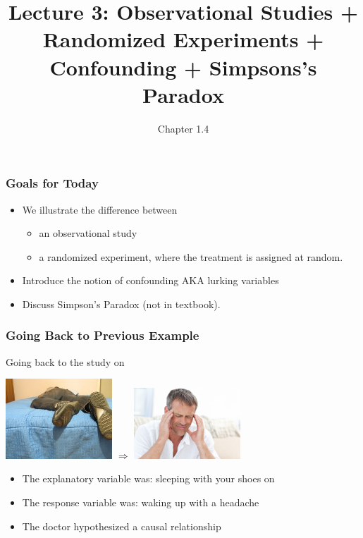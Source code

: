 \documentclass[handout]{beamer}
\title{Lecture 3: Observational Studies + Randomized Experiments + Confounding + Simpsons's Paradox}
\author{Chapter 1.4}
\date{}
\newcommand{\blue}[1]{\textcolor{blue2}{#1}}
\begin{document}
\begin{frame}
\titlepage
\end{frame}


\begin{frame}
\frametitle{Goals for Today}

\begin{itemize}
\item We illustrate the difference between
\begin{itemize}
  \item an \blue{observational study}
  \item a \blue{randomized experiment}, where the treatment is assigned at random.
\end{itemize}
\pause\item Introduce the notion of confounding AKA lurking variables
\pause\item Discuss \blue{Simpson's Paradox} (not in textbook).
\end{itemize}

\end{frame}


\begin{frame}
\frametitle{Going Back to Previous Example}

Going back to the study on 
\begin{center}
\includegraphics[width=0.3\textwidth]{figure/shoes.jpg}
\hspace{1cm}
$\Longrightarrow$
\hspace{1cm}
\includegraphics[width=0.3\textwidth]{figure/headache.jpg}
\end{center}

\begin{itemize}
\item The explanatory variable was: sleeping with your shoes on
\item The response variable was: waking up with a headache
\item The doctor hypothesized a \blue{causal} relationship
\end{itemize}

\end{frame}
\end{document}
